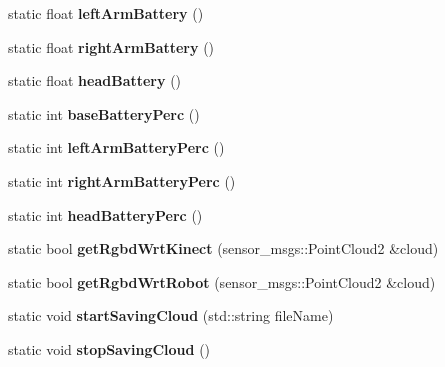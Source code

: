 \begin{DoxyCompactItemize}
\item 
static float {\bfseries left\+Arm\+Battery} ()\hypertarget{class_justina_hardware_a37c35f28c8f6d1bd420578e92aac8d2a}{}\label{class_justina_hardware_a37c35f28c8f6d1bd420578e92aac8d2a}

\item 
static float {\bfseries right\+Arm\+Battery} ()\hypertarget{class_justina_hardware_acc82ef3bc6d4c1a930edf3c94759a674}{}\label{class_justina_hardware_acc82ef3bc6d4c1a930edf3c94759a674}

\item 
static float {\bfseries head\+Battery} ()\hypertarget{class_justina_hardware_ad187bcf845a1c5c42c51d2bb759a7b52}{}\label{class_justina_hardware_ad187bcf845a1c5c42c51d2bb759a7b52}

\item 
static int {\bfseries base\+Battery\+Perc} ()\hypertarget{class_justina_hardware_aae3ba2f39c9e143b1798a9243652e702}{}\label{class_justina_hardware_aae3ba2f39c9e143b1798a9243652e702}

\item 
static int {\bfseries left\+Arm\+Battery\+Perc} ()\hypertarget{class_justina_hardware_a9289218685f3215966f3cabaa4038151}{}\label{class_justina_hardware_a9289218685f3215966f3cabaa4038151}

\item 
static int {\bfseries right\+Arm\+Battery\+Perc} ()\hypertarget{class_justina_hardware_af8200cfdb8c8aa31b26f828481040e2a}{}\label{class_justina_hardware_af8200cfdb8c8aa31b26f828481040e2a}

\item 
static int {\bfseries head\+Battery\+Perc} ()\hypertarget{class_justina_hardware_a5e5ee91bc3eb820ac9bf7f7bb2b881fc}{}\label{class_justina_hardware_a5e5ee91bc3eb820ac9bf7f7bb2b881fc}

\item 
static bool {\bfseries get\+Rgbd\+Wrt\+Kinect} (sensor\+\_\+msgs\+::\+Point\+Cloud2 \&cloud)\hypertarget{class_justina_hardware_a606283790e748026600db5c318f06fa9}{}\label{class_justina_hardware_a606283790e748026600db5c318f06fa9}

\item 
static bool {\bfseries get\+Rgbd\+Wrt\+Robot} (sensor\+\_\+msgs\+::\+Point\+Cloud2 \&cloud)\hypertarget{class_justina_hardware_a0faafb8fc614a806fa21815f247371de}{}\label{class_justina_hardware_a0faafb8fc614a806fa21815f247371de}

\item 
static void {\bfseries start\+Saving\+Cloud} (std\+::string file\+Name)\hypertarget{class_justina_hardware_a002256d141e32b0295ac2fe398166100}{}\label{class_justina_hardware_a002256d141e32b0295ac2fe398166100}

\item 
static void {\bfseries stop\+Saving\+Cloud} ()\hypertarget{class_justina_hardware_a9529bf82533577a1de11ec593f693dec}{}\label{class_justina_hardware_a9529bf82533577a1de11ec593f693dec}

\end{DoxyCompactItemize}


